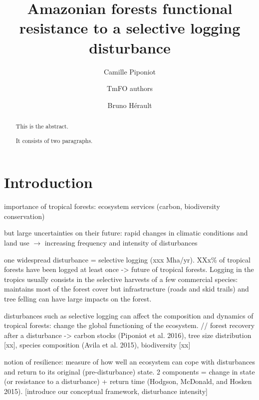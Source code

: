 \documentclass[]{elsarticle} %
\begin{document}
\begin{frontmatter}

  \title{Amazonian forests functional resistance to a selective logging
disturbance}
    \author[1]{Camille Piponiot}
    \author[]{TmFO authors}
  
  
    \author[1, 2]{Bruno Hérault}
  
      \address[1]{Cirad, UR Forets et Societes, Montferrier-sur-Lez, France}
    \address[2]{INPHB, Yamoussoukro, Cote d'Ivoire}
  
  \begin{abstract}
  This is the abstract.
  
  It consists of two paragraphs.
  \end{abstract}
  
 \end{frontmatter}

\section{Introduction}\label{introduction}

importance of tropical forests: ecosystem services (carbon, biodiversity
conservation)

but large uncertainties on their future: rapid changes in climatic
conditions and land use \(\rightarrow\) increasing frequency and
intensity of disturbances

one widespread disturbance = selective logging (xxx Mha/yr). XXx\% of
tropical forests have been logged at least once -\textgreater{} future
of tropical forests. Logging in the tropics usually consists in the
selective harvests of a few commercial species: maintains most of the
forest cover but infrastructure (roads and skid trails) and tree felling
can have large impacts on the forest.

disturbances such as selective logging can affect the composition and
dynamics of tropical forests: change the global functioning of the
ecosystem. // forest recovery after a disturbance -\textgreater{} carbon
stocks (Piponiot et al. 2016), tree size distribution {[}xx{]}, species
composition (Avila et al. 2015), biodiversity {[}xx{]}

notion of resilience: measure of how well an ecosystem can cope with
disturbances and return to its original (pre-disturbance) state. 2
components = change in state (or resistance to a disturbance) + return
time (Hodgson, McDonald, and Hosken 2015). {[}introduce our conceptual
framework, disturbance intensity{]}
\end{document}
